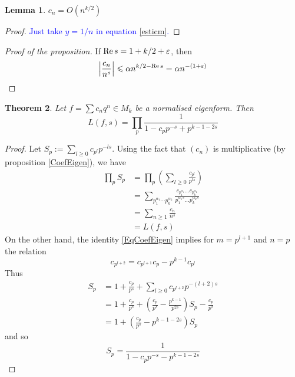 \documentclass[12pt,a4paper,english]{article}
\theoremstyle{plain}
\newtheorem{thm}{Theorem}[section]
\newtheorem{lem}[thm]{Lemma}
\theoremstyle{definition}
\begin{document}
\begin{lem}
$c_n=O(n^{k/2})$
\end{lem}
\begin{proof}
\textcolor{blue}{Just take $y=1/n$ in equation \eqref{esticm}.}
\end{proof}


\begin{proof}[Proof of the proposition]
If $\text{\normalfont Re}\,s=1+k/2+\varepsilon$, then
\begin{equation*}
    \left|\frac{c_n}{n^s}\right|\leqslant\alpha n^{k/2-\text{\normalfont Re}\,s}=\alpha n^{-(1+\varepsilon)}
\end{equation*}
\end{proof}

\begin{thm}
Let $f=\sum c_n q^n\in M_k$ be a normalised eigenform. Then
\begin{equation}\label{eqL}
    L(f,s)=\prod_p\frac{1}{1-c_pp^{-s}+p^{k-1-2s}}
\end{equation}
\end{thm}

\begin{proof}
Let $S_p:=\sum_{l\geqslant 0}c_{p^l}p^{-ls}$. Using the fact that $(c_n)$ is multiplicative (by proposition \eqref{CoefEigen}), we have
\begin{align*}
    \prod_p S_p&=\prod_p\left(\sum_{l\geqslant 0}\frac{c_{p^l}}{p^{ls}}\right)\\
    &=\sum_{p_1^{\alpha_1}\cdots p_k^{\alpha_k}}\frac{c_{p_1^{\alpha_1}}\ldots c_{p_k^{\alpha_k}}}{p_1^{\alpha_1s}\ldots p_k^{\alpha_ks}}\\
    &=\sum_{n\geqslant 1}\frac{c_n}{n^s}\\
    &=L(f,s)
\end{align*}
On the other hand, the identity \eqref{EqCoefEigen} implies for $m=p^{l+1}$ and $n=p$ the relation
\begin{equation*}
    c_{p^{l+2}}=c_{p^{l+1}}c_p-p^{k-1}c_{p^l}
\end{equation*}
Thus
\begin{align*}
    S_p&=1+\frac{c_p}{p^s}+\sum_{l\geqslant 0}c_{p^{l+2}}p^{-(l+2)s}\\
    &=1+\frac{c_p}{p^s}+\left(\frac{c_p}{p^s}-\frac{p^{k-1}}{p^{2s}}\right)S_p-\frac{c_p}{p^s}\\
    &=1+\left(\frac{c_p}{p^s}-p^{k-1-2s}\right)S_p
\end{align*}
and so
\begin{equation*}
    S_p=\frac{1}{1-c_p p^{-s}-p^{k-1-2s}}
\end{equation*}
\end{proof}
\end{document}
